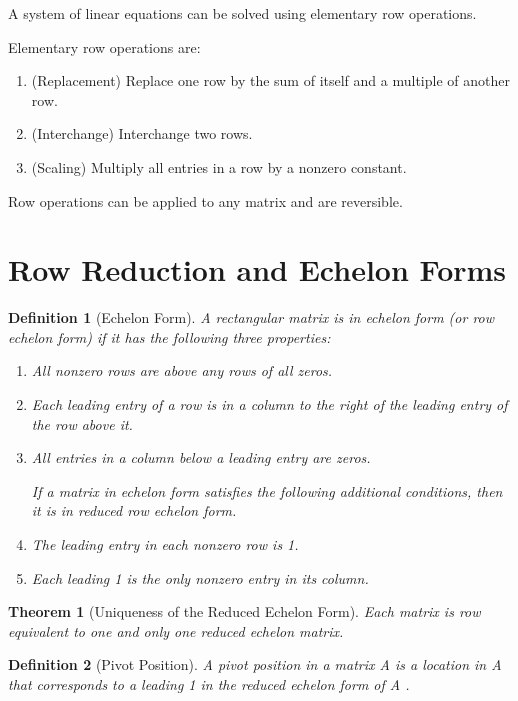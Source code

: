 \documentclass[oneside]{report}
\newtheorem{theorem}{Theorem}[section]
\newtheorem{definition}{Definition}[section]
\begin{document}
A system of linear equations can be solved using elementary row operations.

Elementary row operations are:
\begin{enumerate}
  \item (Replacement) Replace one row by the sum of itself and a multiple of another row.
  \item (Interchange) Interchange two rows.
  \item (Scaling) Multiply all entries in a row by a nonzero constant.
\end{enumerate}

Row operations can be applied to any matrix and are reversible.


\section{Row Reduction and Echelon Forms}

\begin{definition}[Echelon Form]
A rectangular matrix is in echelon form (or row echelon form) if it has the
following three properties:

\begin{enumerate}
  \item All nonzero rows are above any rows of all zeros.
  \item Each leading entry of a row is in a column to the right of the leading entry of the row above it.
  \item All entries in a column below a leading entry are zeros.

  If a matrix in echelon form satisfies the following additional conditions, then it is in reduced row echelon form.

 \item The leading entry in each nonzero row is 1.
 \item Each leading 1 is the only nonzero entry in its column.
\end{enumerate}
\end{definition}

\begin{theorem}[Uniqueness of the Reduced Echelon Form]
  Each matrix is row equivalent to one and only one reduced echelon matrix.
\end{theorem}

\begin{definition}[Pivot Position]
  A pivot position in a matrix A is a location in A that corresponds to a leading 1
  in the reduced echelon form of A .
\end{definition}
\end{document}
